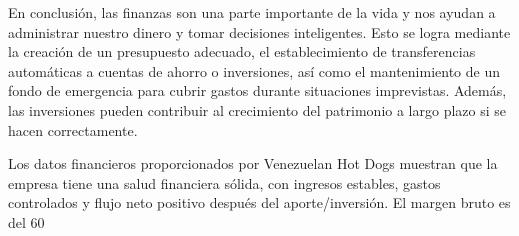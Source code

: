 
                En conclusión, las finanzas son una parte importante de la vida y nos ayudan a administrar nuestro dinero y tomar decisiones inteligentes. Esto se logra mediante la creación de un presupuesto adecuado, el establecimiento de transferencias automáticas a cuentas de ahorro o inversiones, así como el mantenimiento de un fondo de emergencia para cubrir gastos durante situaciones imprevistas. Además, las inversiones pueden contribuir al crecimiento del patrimonio a largo plazo si se hacen correctamente.

                Los datos financieros proporcionados por Venezuelan Hot Dogs muestran que la empresa tiene una salud financiera sólida, con ingresos estables, gastos controlados y flujo neto positivo después del aporte/inversión. El margen bruto es del 60%
